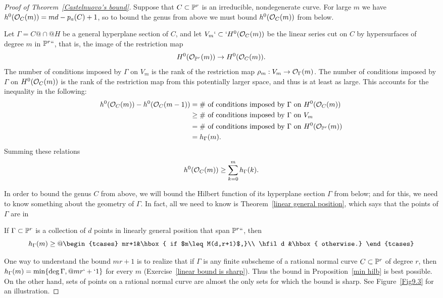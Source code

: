 \begin{proof}[Proof of Theorem~\ref{Castelnuovo's bound}]
Suppose that $C \subset \mathbb P^r$ is an irreducible, nondegenerate curve. For
large $m$ we have
$h^{0}({\mathcal O}_{C}(m)) = md-p_{a}(C) +1$, so to bound the genus from above
we must
bound $h^{0}({\mathcal O}_{C}(m))$ from below.

Let $\Gamma = C@\cap@H$ be a general hyperplane section of $C$, and
let $V_m`\subset`H^0({\mathcal O}_C(m))$ be the linear series cut on $C$ by
hypersurfaces of degree $m$ in $\mathbb P^r` `$, that is, the image of the
restriction map
$$
H^0({\mathcal O}_{\mathbb P^r}(m)) \to H^0({\mathcal O}_C(m)).
$$
The number of  conditions imposed by $\Gamma$ on $V_m$ is the rank of
the restriction map
$\rho_m: V_m \to {\mathcal O}_\Gamma(m)$.
 The number of conditions imposed by $\Gamma$ on $H^{0}({\mathcal O}_{C}(m))$
 is the
 rank of the restriction map from this potentially larger space, and
 thus is at least as large. This
 accounts for the inequality in the following:
{\advance\jot-2pt
\begin{align*}
h^0({\mathcal O}_C(m)) - h^0({\mathcal O}_C(m-1)) & = \text{\# of conditions imposed by
$\Gamma$ on $H^0({\mathcal O}_C(m))$}\\
&\geq \text{\# of conditions imposed by $\Gamma$ on $V_m$} \\
&= \text{\# of conditions imposed by $\Gamma$ on $H^0({\mathcal O}_{\mathbb P^r}(m))$} \\
&= h_\Gamma(m).
\end{align*}}%
Summing these relations
$$
h^0({\mathcal O}_C(m)) \geq \sum_{k=0}^m h_\Gamma(k).
$$

In order to bound the genus $C$ from above, we will bound the Hilbert
function of its hyperplane section $\Gamma$  from below; and for this,
we need to know something about the geometry of $\Gamma$. In fact, all
we need to know is Theorem~\ref{linear general position}, which says
that the points of $\Gamma$ are in 
%

\begin{proposition}\label{min hilb}
If $\Gamma \subset \mathbb P^r$ is a collection of $d$ points in linearly
general position that span $\mathbb P^r` `$, then
$$
h_\Gamma(m) \geq
@
\begin{tcases}
mr+1&\hbox{ if $m\leq M(d,r+1)$,}\\
\hfil d &\hbox{ otherwise.}
\end{tcases}
$$
\end{proposition}

One way to understand the bound $mr+1$ is to realize that if $\Gamma$
is any finite subscheme of a rational normal curve $C\subset\mathbb P^r$
of degree $r$,
then $h_\Gamma(m) = \min\{\deg \Gamma,@ mr`+`1\}$ for every $m$
(Exercise~\ref{linear bound is sharp}).
  Thus the bound in Proposition~\ref{min hilb} is best possible.
On the other hand, sets of points on a rational normal curve are almost
the only sets for which the bound is sharp. See Figure~\ref{Fig9.3}
for an illustration.


\end{proof}
